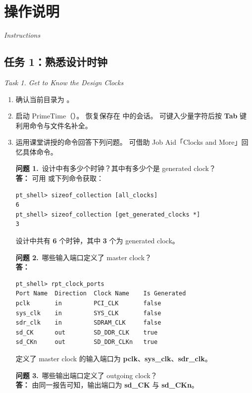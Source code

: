 \section{操作说明}
\label{lab4:instructions}

\noindent\textit{Instructions}

\subsection{任务 1：熟悉设计时钟}
\label{lab4:task1}

\noindent\textit{Task 1. Get to Know the Design Clocks}

\begin{enumerate}
  \item 确认当前目录为 。

  \item 启动 PrimeTime（）。
        恢复保存在  中的会话。
        可键入少量字符后按 \textbf{Tab} 键利用命令与文件名补全。

  \item 运用课堂讲授的命令回答下列问题。
        可借助 Job Aid「Clocks and More」回忆具体命令。

\begin{questionBox}
\textbf{问题 1.}\ 设计中有多少个时钟？其中有多少个是 generated clock？\\[0.35em]
\textbf{答：} 可用  或下列命令获取：
\begin{lstlisting}
pt_shell> sizeof_collection [all_clocks]
6
pt_shell> sizeof_collection [get_generated_clocks *]
3
\end{lstlisting}
设计中共有 \textbf{6} 个时钟，其中 \textbf{3} 个为 generated clock。

\textbf{问题 2.}\ 哪些输入端口定义了 master clock？\\[0.35em]
\textbf{答：}\\
\begin{lstlisting}
pt_shell> rpt_clock_ports
Port Name  Direction  Clock Name    Is Generated
pclk       in         PCI_CLK       false
sys_clk    in         SYS_CLK       false
sdr_clk    in         SDRAM_CLK     false
sd_CK      out        SD_DDR_CLK    true
sd_CKn     out        SD_DDR_CLKn   true
\end{lstlisting}
定义了 master clock 的输入端口为 \textbf{pclk}、\textbf{sys\_clk}、\textbf{sdr\_clk}。

\textbf{问题 3.}\ 哪些输出端口定义了 outgoing clock？\\[0.35em]
\textbf{答：} 由同一报告可知，输出端口为 \textbf{sd\_CK} 与 \textbf{sd\_CKn}。


\end{questionBox}
\end{enumerate}
